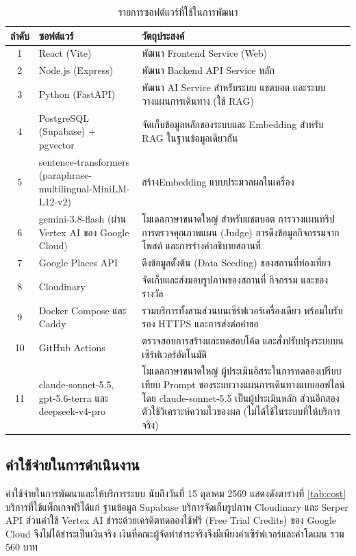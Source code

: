 \nopagebreak
\begin{table}[H]
\centering
\caption{รายการซอฟต์แวร์ที่ใช้ในการพัฒนา}
\label{tab:software}
\begin{tabular}{|c|p{4.3cm}|p{6.5cm}|}
\hline
\textbf{ลำดับ} & \textbf{ซอฟต์แวร์} & \textbf{วัตถุประสงค์} \\
\hline
1 & React (Vite) & พัฒนา Frontend Service (Web) \\ \hline
2 & Node.js (Express) & พัฒนา Backend API Service หลัก \\ \hline
3 & Python (FastAPI) & พัฒนา AI Service สำหรับระบบ แชตบอต และระบบวางแผนการเดินทาง (ใช้ RAG) \\ \hline
4 & PostgreSQL (Supabase) + pgvector & จัดเก็บข้อมูลหลักของระบบและ Embedding สำหรับ RAG ในฐานข้อมูลเดียวกัน \\ \hline
5 & sentence-transformers (paraphrase-multilingual-MiniLM-L12-v2) & สร้างEmbedding แบบประมวลผลในเครื่อง \\ \hline
6 & gemini-3.8-flash (ผ่าน Vertex AI ของ Google Cloud) & โมเดลภาษาขนาดใหญ่ สำหรับแชตบอต การวางแผนทริป การตรวจคุณภาพแผน (Judge) การดึงข้อมูลกิจกรรมจากโพสต์ และการร่างคำอธิบายสถานที่ \\ \hline
7 & Google Places API & ดึงข้อมูลตั้งต้น (Data Seeding) ของสถานที่ท่องเที่ยว \\ \hline
8 & Cloudinary & จัดเก็บและส่งมอบรูปภาพของสถานที่ กิจกรรม และของรางวัล \\ \hline
9 & Docker Compose และ Caddy & รวมบริการทั้งสามส่วนบนเซิร์ฟเวอร์เครื่องเดียว พร้อมใบรับรอง HTTPS และการส่งต่อคำขอ \\ \hline
10 & GitHub Actions & ตรวจสอบการสร้างและทดสอบโค้ด และสั่งปรับปรุงระบบบนเซิร์ฟเวอร์อัตโนมัติ \\ \hline
11 & claude-sonnet-5.5, gpt-5.6-terra และ deepseek-v4-pro & โมเดลภาษาขนาดใหญ่ ผู้ประเมินอิสระในการทดลองเปรียบเทียบ Prompt ของระบบวางแผนการเดินทางแบบออฟไลน์ โดย claude-sonnet-5.5 เป็นผู้ประเมินหลัก ส่วนอีกสองตัวใช้วิเคราะห์ความไวของผล (ไม่ได้ใช้ในระบบที่ให้บริการจริง) \\
\hline
\end{tabular}
\end{table}

\subsection{ค่าใช้จ่ายในการดำเนินงาน}

ค่าใช้จ่ายในการพัฒนาและให้บริการระบบ นับถึงวันที่ 15 ตุลาคม 2569 แสดงดังตารางที่ \ref{tab:cost} บริการที่ใช้แพ็กเกจฟรีได้แก่ ฐานข้อมูล Supabase บริการจัดเก็บรูปภาพ Cloudinary และ Serper API ส่วนค่าใช้ Vertex AI ชำระด้วยเครดิตทดลองใช้ฟรี (Free Trial Credits) ของ Google Cloud จึงไม่ได้ชำระเป็นเงินจริง เงินที่คณะผู้จัดทำชำระจริงจึงมีเพียงค่าเซิร์ฟเวอร์และค่าโดเมน รวม 560 บาท

